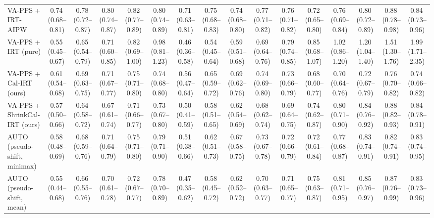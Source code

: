 \begin{tabular}{lccccccccccccccc}
VA-PPS + IRT-AIPW & 0.74\,\scriptsize(0.68--0.81) & 0.78\,\scriptsize(0.72--0.87) & 0.80\,\scriptsize(0.74--0.87) & 0.82\,\scriptsize(0.77--0.89) & 0.80\,\scriptsize(0.74--0.89) & 0.71\,\scriptsize(0.63--0.81) & 0.75\,\scriptsize(0.68--0.83) & 0.74\,\scriptsize(0.68--0.80) & 0.77\,\scriptsize(0.71--0.82) & 0.76\,\scriptsize(0.71--0.82) & 0.72\,\scriptsize(0.65--0.80) & 0.76\,\scriptsize(0.69--0.84) & 0.80\,\scriptsize(0.72--0.89) & 0.88\,\scriptsize(0.78--0.98) & 0.84\,\scriptsize(0.73--0.96) \\
VA-PPS + IRT (pure) & 0.55\,\scriptsize(0.45--0.67) & 0.65\,\scriptsize(0.54--0.79) & 0.71\,\scriptsize(0.60--0.85) & 0.82\,\scriptsize(0.69--1.00) & 0.98\,\scriptsize(0.81--1.23) & 0.46\,\scriptsize(0.36--0.58) & 0.54\,\scriptsize(0.45--0.64) & 0.59\,\scriptsize(0.51--0.68) & 0.69\,\scriptsize(0.64--0.76) & 0.79\,\scriptsize(0.74--0.85) & 0.85\,\scriptsize(0.68--1.07) & 1.02\,\scriptsize(0.86--1.20) & 1.20\,\scriptsize(1.04--1.40) & 1.51\,\scriptsize(1.30--1.76) & 1.99\,\scriptsize(1.71--2.35) \\
VA-PPS + Cal-IRT (ours) & 0.61\,\scriptsize(0.54--0.68) & 0.69\,\scriptsize(0.63--0.75) & 0.71\,\scriptsize(0.67--0.77) & 0.75\,\scriptsize(0.71--0.80) & 0.74\,\scriptsize(0.68--0.80) & 0.56\,\scriptsize(0.47--0.64) & 0.65\,\scriptsize(0.59--0.72) & 0.69\,\scriptsize(0.62--0.76) & 0.74\,\scriptsize(0.69--0.80) & 0.73\,\scriptsize(0.66--0.79) & 0.68\,\scriptsize(0.60--0.77) & 0.70\,\scriptsize(0.64--0.76) & 0.72\,\scriptsize(0.67--0.79) & 0.76\,\scriptsize(0.70--0.82) & 0.74\,\scriptsize(0.66--0.82) \\
VA-PPS + ShrinkCal-IRT (ours) & 0.57\,\scriptsize(0.50--0.66) & 0.64\,\scriptsize(0.58--0.72) & 0.67\,\scriptsize(0.61--0.74) & 0.71\,\scriptsize(0.66--0.77) & 0.73\,\scriptsize(0.67--0.80) & 0.50\,\scriptsize(0.41--0.59) & 0.58\,\scriptsize(0.51--0.65) & 0.62\,\scriptsize(0.54--0.69) & 0.68\,\scriptsize(0.62--0.74) & 0.69\,\scriptsize(0.64--0.75) & 0.74\,\scriptsize(0.62--0.87) & 0.80\,\scriptsize(0.71--0.90) & 0.84\,\scriptsize(0.76--0.92) & 0.88\,\scriptsize(0.82--0.93) & 0.84\,\scriptsize(0.78--0.91) \\
AUTO (pseudo-shift, minimax) & 0.58\,\scriptsize(0.48--0.69) & 0.68\,\scriptsize(0.59--0.76) & 0.71\,\scriptsize(0.64--0.79) & 0.75\,\scriptsize(0.71--0.80) & 0.79\,\scriptsize(0.71--0.90) & 0.51\,\scriptsize(0.38--0.66) & 0.62\,\scriptsize(0.51--0.73) & 0.67\,\scriptsize(0.58--0.75) & 0.73\,\scriptsize(0.67--0.78) & 0.72\,\scriptsize(0.66--0.79) & 0.72\,\scriptsize(0.61--0.84) & 0.77\,\scriptsize(0.68--0.87) & 0.83\,\scriptsize(0.74--0.91) & 0.82\,\scriptsize(0.74--0.91) & 0.83\,\scriptsize(0.74--0.95) \\
AUTO (pseudo-shift, mean) & 0.55\,\scriptsize(0.44--0.68) & 0.66\,\scriptsize(0.55--0.76) & 0.70\,\scriptsize(0.61--0.78) & 0.72\,\scriptsize(0.67--0.77) & 0.78\,\scriptsize(0.70--0.89) & 0.47\,\scriptsize(0.35--0.62) & 0.58\,\scriptsize(0.45--0.72) & 0.62\,\scriptsize(0.52--0.72) & 0.70\,\scriptsize(0.63--0.77) & 0.71\,\scriptsize(0.65--0.77) & 0.75\,\scriptsize(0.63--0.87) & 0.81\,\scriptsize(0.71--0.95) & 0.85\,\scriptsize(0.76--0.97) & 0.87\,\scriptsize(0.76--0.99) & 0.83\,\scriptsize(0.73--0.96) \\
\bottomrule
\end{tabular}
